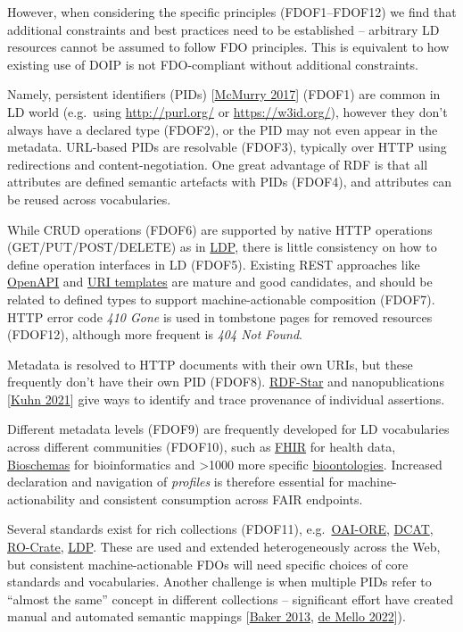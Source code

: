 However, when considering the specific principles (FDOF1--FDOF12) we
find that additional constraints and best practices need to be
established -- arbitrary LD resources cannot be assumed to follow FDO
principles. This is equivalent to how existing use of DOIP is not
FDO-compliant without additional constraints.

Namely, persistent identifiers (PIDs)
{[}\href{https://doi.org/10.1371/journal.pbio.2001414}{McMurry 2017}{]}
(FDOF1) are common in LD world (e.g.~using \url{http://purl.org/} or
\url{https://w3id.org/}), however they don't always have a declared type
(FDOF2), or the PID may not even appear in the metadata. URL-based PIDs
are resolvable (FDOF3), typically over HTTP using redirections and
content-negotiation. One great advantage of RDF is that all attributes
are defined semantic artefacts with PIDs (FDOF4), and attributes can be
reused across vocabularies.

While CRUD operations (FDOF6) are supported by native HTTP operations
(GET/PUT/POST/DELETE) as in \href{https://www.w3.org/TR/ldp/}{LDP},
there is little consistency on how to define operation interfaces in LD
(FDOF5). Existing REST approaches like
\href{https://swagger.io/specification/}{OpenAPI} and
\href{https://doi.org/10.17487/RFC6570}{URI templates} are mature and
good candidates, and should be related to defined types to support
machine-actionable composition (FDOF7). HTTP error code \emph{410 Gone}
is used in tombstone pages for removed resources (FDOF12), although more
frequent is \emph{404 Not Found}.

Metadata is resolved to HTTP documents with their own URIs, but these
frequently don't have their own PID (FDOF8).
\href{https://w3c.github.io/rdf-star/}{RDF-Star} and nanopublications
{[}\href{https://doi.org/10.7717/peerj-cs.387}{Kuhn 2021}{]} give ways
to identify and trace provenance of individual assertions.

Different metadata levels (FDOF9) are frequently developed for LD
vocabularies across different communities (FDOF10), such as
\href{http://hl7.org/fhir/}{FHIR} for health data,
\href{https://bioschemas.org/}{Bioschemas} for bioinformatics and
\textgreater1000 more specific
\href{https://bioportal.bioontology.org/ontologies}{bioontologies}.
Increased declaration and navigation of \emph{profiles} is therefore
essential for machine-actionability and consistent consumption across
FAIR endpoints.

Several standards exist for rich collections (FDOF11),
e.g.~\href{https://www.openarchives.org/ore/}{OAI-ORE},
\href{https://www.w3.org/TR/vocab-dcat-3/}{DCAT},
\href{https://www.researchobject.org/ro-crate/}{RO-Crate},
\href{https://www.w3.org/TR/ldp/}{LDP}. These are used and extended
heterogeneously across the Web, but consistent machine-actionable FDOs
will need specific choices of core standards and vocabularies. Another
challenge is when multiple PIDs refer to ``almost the same'' concept in
different collections -- significant effort have created manual and
automated semantic mappings
{[}\href{https://doi.org/10.1016/j.websem.2013.05.001}{Baker 2013},
\href{https://doi.org/10.1007/s12553-022-00639-w}{de Mello 2022}{]}).

